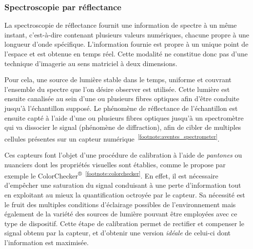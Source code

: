 \subsubsection{Spectroscopie par réflectance}
La spectroscopie de réflectance fournit une information de spectre à un même instant, c’est-à-dire contenant plusieurs valeurs numériques, chacune propre à une longueur d'onde spécifique. L'information fournie est propre à un unique point de l'espace et est obtenue en temps réel. Cette modalité ne constitue donc pas d'une technique d'imagerie au sens matriciel à deux dimensions.\par

Pour cela, une source de lumière stable dans le temps, uniforme et couvrant l'ensemble du spectre que l'on désire observer est utilisée. Cette lumière est ensuite canalisée au sein d'une ou plusieurs fibres optiques afin d'être conduite jusqu'à l'échantillon supposé. Le phénomène de réflectance de l'échantillon est ensuite capté à l'aide d'une ou plusieurs fibres optiques jusqu'à un spectromètre qui va dissocier le signal (phénomène de diffraction), afin de cibler de multiples cellules présentes sur un capteur numérique~\cite{Murphy2005,Malla2008}\textsuperscript{\ref{footnote:aventes_spectrometer}}.\par

Ces capteurs font l'objet d'une procédure de calibration à l'aide de \textit{pantones} ou nuanciers dont les propriétés visuelles sont établies, comme le propose par exemple le ColorChecker\textsuperscript{®}~\textsuperscript{\ref{footnote:colorchecker}}. En effet, il est nécessaire d'empêcher une saturation du signal conduisant à une perte d'information tout en exploitant au mieux la quantification octroyée par le capteur. Sa nécessité est le fruit des multiples conditions d'éclairage possibles de l'environnement mais également de la variété des sources de lumière pouvant être employées avec ce type de dispositif. Cette étape de calibration permet de rectifier et compenser le signal obtenu par la capteur, et d'obtenir une version \textit{idéale} de celui-ci dont l'information est maximisée.\par

